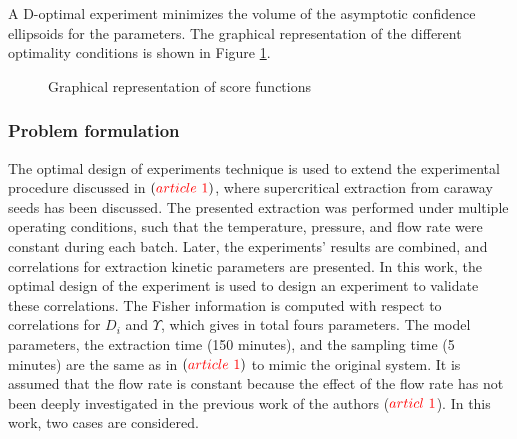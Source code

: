 \documentclass[../Article_Design_of_Experiment.tex]{subfiles}
\begin{document}
	A D-optimal experiment minimizes the volume of the asymptotic confidence ellipsoids for the parameters. The graphical representation of the different optimality conditions is shown in Figure \ref{fig:score_fun}.
	
	\begin{figure}[!h]
		\centering
		\caption{Graphical representation of score functions}
		\label{fig:score_fun}
	\end{figure}
	
	\subsubsection{Problem formulation}
	
	The optimal design of experiments technique is used to extend the experimental procedure discussed in $({\color{red}article~1})$, where supercritical extraction from caraway seeds has been discussed. The presented extraction was performed under multiple operating conditions, such that the temperature, pressure, and flow rate were constant during each batch. Later, the experiments' results are combined, and correlations for extraction kinetic parameters are presented. In this work, the optimal design of the experiment is used to design an experiment to validate these correlations. The Fisher information is computed with respect to correlations for $D_i$ and $\Upsilon$, which gives in total fours parameters. The model parameters, the extraction time (150 minutes), and the sampling time (5 minutes) are the same as in $({\color{red}article~1})$ to mimic the original system. It is assumed that the flow rate is constant because the effect of the flow rate has not been deeply investigated in the previous work of the authors (${\color{red}articl~1}$). In this work, two cases are considered. 
	
\end{document}
